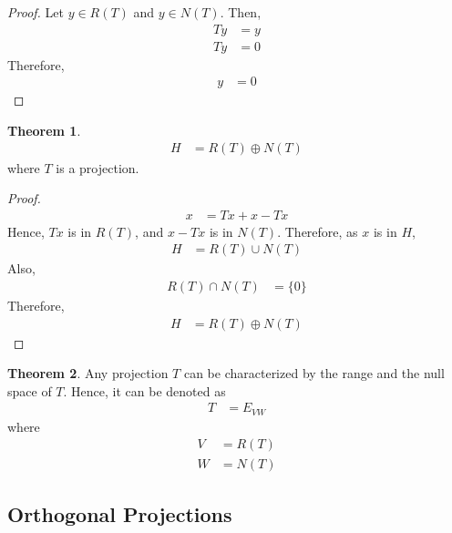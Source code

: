\documentclass[titlepage, fleqn, a4paper, 12pt, twoside]{article}
\theoremstyle{definition}
\theoremstyle{theorem}
\newtheorem{theorem}{Theorem}
\begin{document}
\begin{proof}
	Let $y \in R(T)$ and $y \in N(T)$.
	Then,
	\begin{align*}
		T y &= y\\
		T y &= 0
	\end{align*}
	Therefore,
	\begin{align*}
		y &= 0
	\end{align*}
\end{proof}

\begin{theorem}
	\begin{align*}
		H &= R(T) \oplus N(T)
	\end{align*}
	where $T$ is a projection.
\end{theorem}

\begin{proof}
	\begin{align*}
		x &= T x + x - T x
	\end{align*}
	Hence, $T x$ is in $R(T)$, and $x - T x$ is in $N(T)$.
	Therefore, as $x$ is in $H$,
	\begin{align*}
		H &= R(T) \cup N(T)
	\end{align*}
	Also,
	\begin{align*}
		R(T) \cap N(T) &= \{0\}
	\end{align*}
	Therefore,
	\begin{align*}
		H &= R(T) \oplus N(T)
	\end{align*}
\end{proof}

\begin{theorem}
	Any projection $T$ can be characterized by the range and the null space of $T$.
	Hence, it can be denoted as
	\begin{align*}
		T &= E_{V W}
	\end{align*}
	where
	\begin{align*}
		V &= R(T)\\
		W &= N(T)
	\end{align*}
\end{theorem}

\subsection{Orthogonal Projections}
\end{document}
